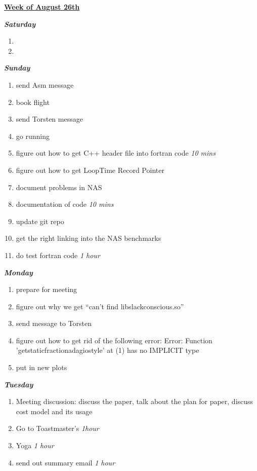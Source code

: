 \documentclass[11pt]{article}
\newcommand{\timeEst}[1]{\textit{#1}}
\begin{document}
\underline{\textbf{Week of August 26th}}

\textbf{\textit{Saturday}}
\begin{enumerate}
\item
\item
\end{enumerate}

\textbf{\textit{Sunday}}
\begin{enumerate}
\item send Asm message
\item book flight
\item send Torsten message
\item go running
\item figure out how to get C++ header file into fortran code \timeEst{10 mins}
\item figure out how to get LoopTime Record Pointer
\item document problems in NAS
\item documentation of code \timeEst{ 10 mins}
\item update git repo
\item get the right linking into the NAS benchmarks
\item do test fortran code \timeEst{1 hour}
\end{enumerate}

\textbf{\textit{Monday}}
\begin{enumerate}
\item prepare for meeting
\item  figure out why we get ``can't find libslackconscious.so''
\item send message to Torsten
\item figure out how to get rid of the following error:  Error: Function 'getstaticfractionadagiostyle' at (1) has no IMPLICIT type
\item put in new plots
\end{enumerate}

\textbf{\textit{Tuesday}}
\begin{enumerate}
\item Meeting discussion: discuss the paper, talk about the plan for paper, discuss cost model and its usage
\item Go to Toastmaster's \timeEst{ 1hour}
\item Yoga \timeEst{1 hour}
\item send out summary email \timeEst{1 hour}
\end{enumerate}
\end{document}
